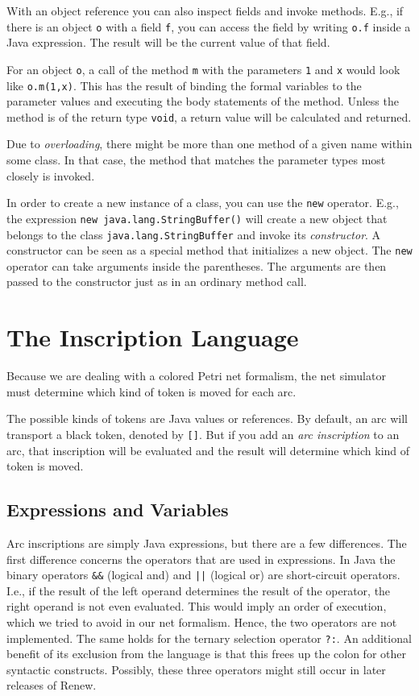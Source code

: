With an object reference you can also inspect fields and invoke
methods. E.g., if there is an object \texttt{o} with a field \texttt{f},
you can access the field by writing \texttt{o.f} inside a Java expression.
The result will be the current value of that field.

For an object \texttt{o}, a call of the method \texttt{m} with the parameters
\texttt{1} and \texttt{x} would look like \texttt{o.m(1,x)}.
This has the result of binding the formal variables to the parameter values
and executing the body statements of the method. Unless the method is
of the return type \texttt{void}, a return value will be calculated and
returned.

Due to \emph{overloading},
there might be more than one method of a given name within some class.
In that case, the method that matches the parameter types
most closely is invoked.

In order to create a new instance of a class, you can use the
\texttt{new} operator. E.g., the expression
\texttt{new java.lang.StringBuffer()}
will create a new object that belongs to the class \texttt{java.lang.StringBuffer}
and invoke its \emph{constructor}. A constructor can be seen as a special
method that initializes a new object. The \texttt{new} operator
can take arguments inside the parentheses. The arguments are then passed
to the constructor just as in an ordinary method call.


\section{The Inscription Language}
\label{sec:inscrlang}

Because we are dealing with a colored Petri net formalism,
the net simulator must determine which kind of token is moved for
each arc.

The possible kinds of tokens are Java values or references.
By default, an arc will transport a black token,
denoted by \texttt{[]}. But if you add an
\emph{arc inscription} to an arc, that inscription will be evaluated
and the result will determine which kind of token is moved.

\subsection{Expressions and Variables}

Arc inscriptions are simply Java expressions, but there are a
few differences.
The first difference concerns the operators that are used in
expressions. In Java the binary operators \verb:&&: (logical and)
and \verb:||: (logical or) are short-circuit operators. I.e., if the
result of the left operand determines the result of the operator,
the right operand is not even evaluated. This would imply
an order of execution, which we tried to avoid in our net formalism.
Hence, the two operators are not implemented.
The same holds for the ternary selection operator \verb|?:|.
An additional benefit of its exclusion from the language is
that this frees up the colon for other
syntactic constructs. Possibly, these three operators might
still occur in later releases of Renew.

